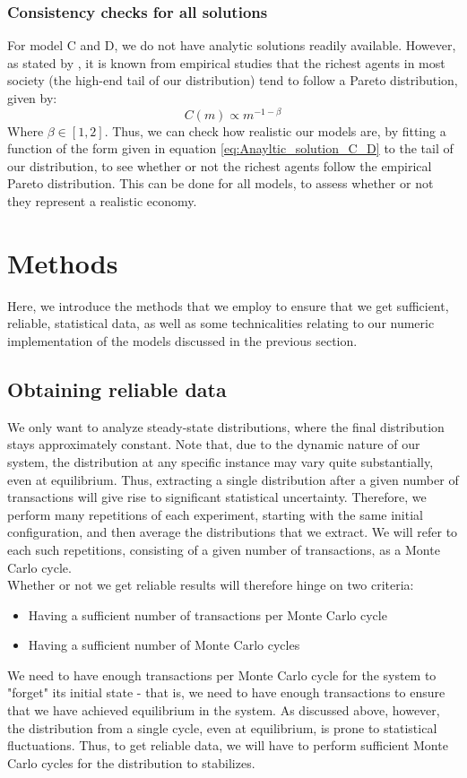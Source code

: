 \documentclass[a4paper, 10pt]{article}
\begin{document}
\subsubsection{Consistency checks for all solutions}
For model C and D, we do not have analytic solutions readily available. However, as stated by \cite{Gibbs}, it is known from empirical studies that the richest agents in most society (the high-end tail of our distribution) tend to follow a Pareto distribution, given by:
\begin{equation}\label{eq:Anayltic_solution_C_D}
C(m) \propto m^{-1-\beta}
\end{equation}
Where $\beta \in [1,2]$. Thus, we can check how realistic our models are, by fitting a function of the form given in equation \ref{eq:Anayltic_solution_C_D} to the tail of our distribution, to see whether or not the richest agents follow the empirical Pareto distribution. This can be done for all models, to assess whether or not they represent a realistic economy.
\section{Methods}\label{Method_section}
Here, we introduce the methods that we employ to ensure that we get sufficient, reliable, statistical data, as well as some technicalities relating to our numeric implementation of the models discussed in the previous section.
\subsection{Obtaining reliable data}
We only want to analyze steady-state distributions, where the final distribution stays approximately constant. Note that, due to the dynamic nature of our system, the distribution at any specific instance may vary quite substantially, even at equilibrium. Thus, extracting a single distribution after a given number of transactions will give rise to significant statistical uncertainty. Therefore, we perform many repetitions of each experiment, starting with the same initial configuration, and then average the distributions that we extract. We will refer to each such repetitions, consisting of a given number of transactions, as a Monte Carlo cycle.\\
\linebreak
Whether or not we get reliable results will therefore hinge on two criteria:
\begin{itemize}
\item Having a sufficient number of transactions per Monte Carlo cycle
\item Having a sufficient number of Monte Carlo cycles
\end{itemize}
We need to have enough transactions per Monte Carlo cycle for the system to "forget" its initial state - that is, we need to have enough transactions to ensure that we have achieved equilibrium in the system. As discussed above, however, the distribution from a single cycle, even at equilibrium, is prone to statistical fluctuations. Thus, to get reliable data, we will have to perform sufficient Monte Carlo cycles for the distribution to stabilizes.\\
\end{document}
